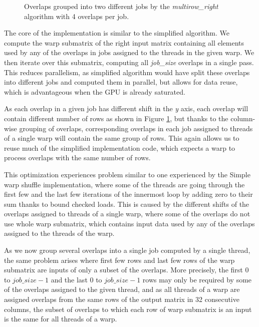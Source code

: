 \begin{figure}[ht]
	\centering
	\def\svgwidth{0.5\textwidth}
	\fontsize{6}{8}\selectfont
	
	\caption{Overlaps grouped into two different jobs by the \textit{multirow\_right} algorithm with 4 overlaps per job.}
	\label{fig:multirow_shifts}
\end{figure}

The core of the implementation is similar to the simplified algorithm. We compute the warp submatrix of the right input matrix containing all elements used by any of the overlaps in jobs assigned to the threads in the given warp. We then iterate over this submatrix, computing all \textit{job\_size} overlaps in a single pass. This reduces parallelism, as simplified algorithm would have split these overlaps into different jobs and computed them in parallel, but allows for data reuse, which is advantageous when the GPU is already saturated.

As each overlap in a given job has different shift in the \textit{y} axis, each overlap will contain different number of rows as shown in Figure \ref{fig:multirow_shifts}, but thanks to the column-wise grouping of overlaps, corresponding overlaps in each job assigned to threads of a single warp will contain the same group of rows. This again allows us to reuse much of the simplified implementation code, which expects a warp to process overlaps with the same number of rows.

This optimization experiences problem similar to one experienced by the Simple warp shuffle implementation, where some of the threads are going through the first few and the last few iterations of the innermost loop by adding zero to their sum thanks to bound checked loads. This is caused by the different shifts of the overlaps assigned to threads of a single warp, where some of the overlaps do not use whole warp submatrix, which contains input data used by any of the overlaps assigned to the threads of the warp.

As we now group several overlaps into a single job computed by a single thread, the same problem arises where first few rows and last few rows of the warp submatrix are inputs of only a subset of the overlaps. More precisely, the first $0$ to $job\_size - 1$ and the last $0$ to $job\_size - 1$ rows may only be required by some of the overlaps assigned to the given thread, and as all threads of a warp are assigned overlaps from the same rows of the output matrix in 32 consecutive columns, the subset of overlaps to which each row of warp submatrix is an input is the same for all threads of a warp.

